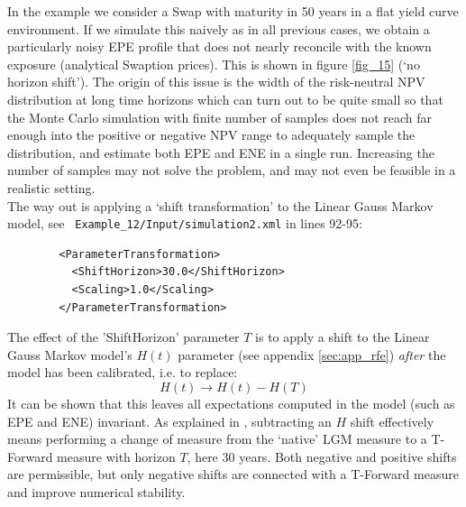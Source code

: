 \documentclass[12pt, a4paper]{article}
\begin{document}
In the example we consider a Swap with maturity in 50 years in a flat yield curve environment. If we simulate this
naively as in all previous cases, we obtain a particularly noisy EPE profile that does not nearly reconcile with the
known exposure (analytical Swaption prices). This is shown in figure \ref{fig_15} (`no horizon shift'). The origin of
this issue is the width of the risk-neutral NPV distribution at long time horizons which can turn out to be quite small
so that the Monte Carlo simulation with finite number of samples does not reach far enough into the positive or negative
NPV range to adequately sample the distribution, and estimate both EPE and ENE in a single run.  Increasing the number
of samples may not solve the problem, and may not even be feasible in a realistic setting. \\

The way out is applying a `shift transformation' to the Linear Gauss Markov model, see {\tt
  Example\_12/Input/simulation2.xml} in lines 92-95:
\begin{listing}[H]
\begin{verbatim}
        <ParameterTransformation>
          <ShiftHorizon>30.0</ShiftHorizon>
          <Scaling>1.0</Scaling>
        </ParameterTransformation>
\end{verbatim}
\end{listing}

The effect of the 'ShiftHorizon' parameter $T$ is to apply a shift to the Linear Gauss Markov model's $H(t)$ parameter
(see appendix \ref{sec:app_rfe}) {\em after} the model has been calibrated, i.e. to replace:
$$ 
H(t) \rightarrow H(t) - H(T) 
$$ 
It can be shown that this leaves all expectations computed in the model (such as EPE and ENE) invariant. As explained in
\cite{Lichters}, subtracting an $H$ shift effectively means performing a change of measure from the `native' LGM measure
to a T-Forward measure with horizon $T$, here 30 years. Both negative and positive shifts are permissible, but only
negative shifts are connected with a T-Forward measure and improve numerical stability. \\
\end{document}
